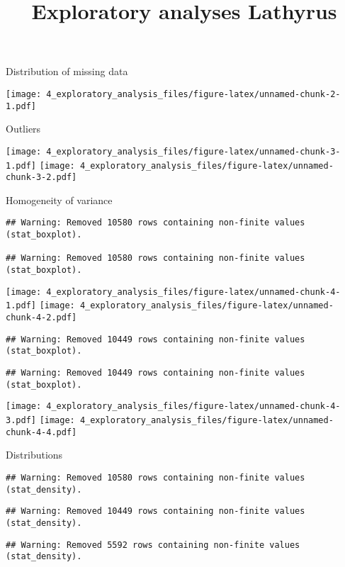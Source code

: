\documentclass[]{article}
\title{Exploratory analyses Lathyrus}
\author{}
\date{}
\begin{document}
\maketitle

Distribution of missing data

\texttt{[image: 4\_exploratory\_analysis\_files/figure-latex/unnamed-chunk-2-1.pdf]}

Outliers

\texttt{[image: 4\_exploratory\_analysis\_files/figure-latex/unnamed-chunk-3-1.pdf]}
\texttt{[image: 4\_exploratory\_analysis\_files/figure-latex/unnamed-chunk-3-2.pdf]}

Homogeneity of variance

\begin{verbatim}
## Warning: Removed 10580 rows containing non-finite values (stat_boxplot).

## Warning: Removed 10580 rows containing non-finite values (stat_boxplot).
\end{verbatim}

\texttt{[image: 4\_exploratory\_analysis\_files/figure-latex/unnamed-chunk-4-1.pdf]}
\texttt{[image: 4\_exploratory\_analysis\_files/figure-latex/unnamed-chunk-4-2.pdf]}

\begin{verbatim}
## Warning: Removed 10449 rows containing non-finite values (stat_boxplot).
\end{verbatim}

\begin{verbatim}
## Warning: Removed 10449 rows containing non-finite values (stat_boxplot).
\end{verbatim}

\texttt{[image: 4\_exploratory\_analysis\_files/figure-latex/unnamed-chunk-4-3.pdf]}
\texttt{[image: 4\_exploratory\_analysis\_files/figure-latex/unnamed-chunk-4-4.pdf]}

Distributions

\begin{verbatim}
## Warning: Removed 10580 rows containing non-finite values (stat_density).
\end{verbatim}

\begin{verbatim}
## Warning: Removed 10449 rows containing non-finite values (stat_density).
\end{verbatim}

\begin{verbatim}
## Warning: Removed 5592 rows containing non-finite values (stat_density).
\end{verbatim}
\end{document}
